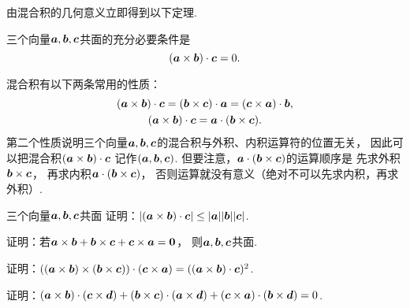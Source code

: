 由混合积的几何意义立即得到以下定理.
\begin{theorem}
三个向量\(\boldsymbol{a},\boldsymbol{b},\boldsymbol{c}\)共面的充分必要条件是\begin{equation*}
	(\boldsymbol{a}\times\boldsymbol{b})\cdot\boldsymbol{c} = 0.
\end{equation*}
\end{theorem}

混合积有以下两条常用的性质：
\begin{gather}
	(\boldsymbol{a}\times\boldsymbol{b})\cdot\boldsymbol{c}
	= (\boldsymbol{b}\times\boldsymbol{c})\cdot\boldsymbol{a}
	= (\boldsymbol{c}\times\boldsymbol{a})\cdot\boldsymbol{b}, \\
	(\boldsymbol{a}\times\boldsymbol{b})\cdot\boldsymbol{c}
	= \boldsymbol{a}\cdot(\boldsymbol{b}\times\boldsymbol{c}).
\end{gather}
第二个性质说明三个向量\(\boldsymbol{a},\boldsymbol{b},\boldsymbol{c}\)的混合积与外积、内积运算符的位置无关，
因此可以把混合积\((\boldsymbol{a}\times\boldsymbol{b})\cdot\boldsymbol{c}\)
记作\((\boldsymbol{a},\boldsymbol{b},\boldsymbol{c})\).
但要注意，\(\boldsymbol{a}\cdot(\boldsymbol{b}\times\boldsymbol{c})\)的运算顺序是
先求外积\(\boldsymbol{b}\times\boldsymbol{c}\)，
再求内积\(\boldsymbol{a}\cdot(\boldsymbol{b}\times\boldsymbol{c})\)，
否则运算就没有意义（绝对不可以先求内积，再求外积）.

\begin{example}
三个向量\(\boldsymbol{a},\boldsymbol{b},\boldsymbol{c}\)共面
证明：\(
	\abs{(\boldsymbol{a}\times\boldsymbol{b})\cdot\boldsymbol{c}}
	\leq \abs{\boldsymbol{a}} \abs{\boldsymbol{b}} \abs{\boldsymbol{c}}
\).
\end{example}

\begin{example}
证明：若\(
	\boldsymbol{a}\times\boldsymbol{b}
	+ \boldsymbol{b}\times\boldsymbol{c}
	+ \boldsymbol{c}\times\boldsymbol{a}
	= \boldsymbol{0}
\)，
则\(\boldsymbol{a},\boldsymbol{b},\boldsymbol{c}\)共面.
\end{example}

\begin{example}
证明：\(
	((\boldsymbol{a}\times\boldsymbol{b})\times(\boldsymbol{b}\times\boldsymbol{c}))\cdot(\boldsymbol{c}\times\boldsymbol{a})
	= ((\boldsymbol{a}\times\boldsymbol{b})\cdot\boldsymbol{c})^2
\).
\end{example}

\begin{example}
证明：\((\boldsymbol{a}\times\boldsymbol{b})\cdot(\boldsymbol{c}\times\boldsymbol{d})
+ (\boldsymbol{b}\times\boldsymbol{c})\cdot(\boldsymbol{a}\times\boldsymbol{d})
+ (\boldsymbol{c}\times\boldsymbol{a})\cdot(\boldsymbol{b}\times\boldsymbol{d})
= 0\).
\end{example}

